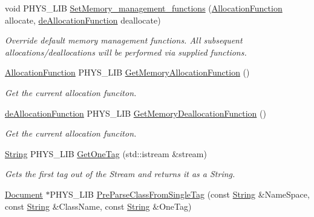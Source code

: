 \begin{DoxyCompactItemize}
void PHYS\_\-LIB \hyperlink{namespacephys_1_1xml_a2ad88e4331ac29a86c99d5e40b31f983}{SetMemory\_\-management\_\-functions} (\hyperlink{namespacephys_1_1xml_a6d772c4cf52d017d4d6ad68ddcbd493f}{AllocationFunction} allocate, \hyperlink{namespacephys_1_1xml_af98b1cb6640aa712180aad89a1c776d8}{deAllocationFunction} deallocate)
\begin{DoxyCompactList}\small\item\em Override default memory management functions. All subsequent allocations/deallocations will be performed via supplied functions. \item\end{DoxyCompactList}\item 
\hyperlink{namespacephys_1_1xml_a6d772c4cf52d017d4d6ad68ddcbd493f}{AllocationFunction} PHYS\_\-LIB \hyperlink{namespacephys_1_1xml_a0537fb34f1fa41afd138deead1455a5b}{GetMemoryAllocationFunction} ()
\begin{DoxyCompactList}\small\item\em Get the current allocation funciton. \item\end{DoxyCompactList}\item 
\hyperlink{namespacephys_1_1xml_af98b1cb6640aa712180aad89a1c776d8}{deAllocationFunction} PHYS\_\-LIB \hyperlink{namespacephys_1_1xml_a1a2ff3e010e4627424a65a2e584e441e}{GetMemoryDeallocationFunction} ()
\begin{DoxyCompactList}\small\item\em Get the current allocation funciton. \item\end{DoxyCompactList}\item 
\hyperlink{namespacephys_1_1xml_a4d8ca7638328d16d303e5a4c849f4704}{String} PHYS\_\-LIB \hyperlink{namespacephys_1_1xml_a2b175958ac1d39cc297c24e3f377739b}{GetOneTag} (std::istream \&stream)
\begin{DoxyCompactList}\small\item\em Gets the first tag out of the Stream and returns it as a String. \item\end{DoxyCompactList}\item 
\hyperlink{classphys_1_1xml_1_1Document}{Document} $\ast$PHYS\_\-LIB \hyperlink{namespacephys_1_1xml_ab5e51b3ea3a6e61bf4c8368005232210}{PreParseClassFromSingleTag} (const \hyperlink{namespacephys_1_1xml_a4d8ca7638328d16d303e5a4c849f4704}{String} \&NameSpace, const \hyperlink{namespacephys_1_1xml_a4d8ca7638328d16d303e5a4c849f4704}{String} \&ClassName, const \hyperlink{namespacephys_1_1xml_a4d8ca7638328d16d303e5a4c849f4704}{String} \&OneTag)

\end{DoxyCompactItemize}
